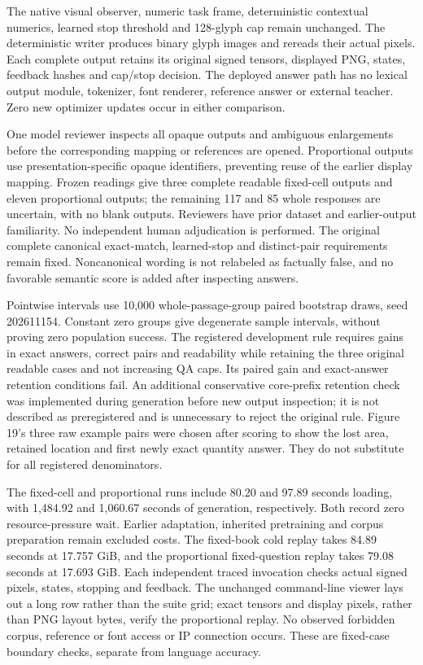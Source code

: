 \documentclass[12pt,a4paper]{article}
\providecommand{\DIFadd}[1]{{\protect\color{blue} \sf #1}} %
\begin{document}
\DIFadd{The native visual observer, numeric task frame, deterministic contextual
numerics, learned stop threshold and 128-glyph cap remain unchanged. The
deterministic writer produces binary glyph images and rereads their actual
pixels. Each complete output retains its original signed tensors, displayed
PNG, states, feedback hashes and cap/stop decision. The deployed answer path
has no lexical output module, tokenizer, font renderer, reference answer or
external teacher. Zero new optimizer updates occur in either comparison.
}

\DIFadd{One model reviewer inspects all opaque outputs and ambiguous enlargements
before the corresponding mapping or references are opened. Proportional
outputs use presentation-specific opaque identifiers, preventing reuse of
the earlier display mapping. Frozen readings give three complete readable
fixed-cell outputs and eleven proportional outputs; the remaining 117 and
85 whole responses are uncertain, with no blank outputs. Reviewers have
prior dataset and earlier-output familiarity. No independent human
adjudication is performed. The original complete canonical exact-match,
learned-stop and distinct-pair requirements remain fixed. Noncanonical
wording is not relabeled as factually false, and no favorable semantic score
is added after inspecting answers.
}

\DIFadd{Pointwise intervals use 10,000 whole-passage-group paired bootstrap draws,
seed 202611154. Constant zero groups give degenerate sample intervals,
without proving zero population success. The registered development rule
requires gains in exact answers, correct pairs and readability while retaining
the three original readable cases and not increasing QA caps. Its paired
gain and exact-answer retention conditions fail. An additional conservative
core-prefix retention check was implemented during generation before new
output inspection; it is not described as preregistered and is unnecessary
to reject the original rule. Figure 19's three raw example pairs were chosen
after scoring to show the lost area, retained location and first newly exact
quantity answer. They do not substitute for all registered denominators.
}

\DIFadd{The fixed-cell and proportional runs include 80.20 and 97.89 seconds loading,
with 1,484.92 and 1,060.67 seconds of generation, respectively. Both record
zero resource-pressure wait. Earlier adaptation, inherited pretraining and
corpus preparation remain excluded costs. The fixed-book cold replay takes
84.89 seconds at 17.757 GiB, and the proportional fixed-question replay takes
79.08 seconds at 17.693 GiB. Each independent traced invocation checks actual
signed pixels, states, stopping and feedback. The unchanged command-line
viewer lays out a long row rather than the suite grid; exact tensors and
display pixels, rather than PNG layout bytes, verify the proportional replay.
No observed forbidden corpus, reference or font access or IP connection occurs.
These are fixed-case boundary checks, separate from language accuracy.
}
\end{document}
